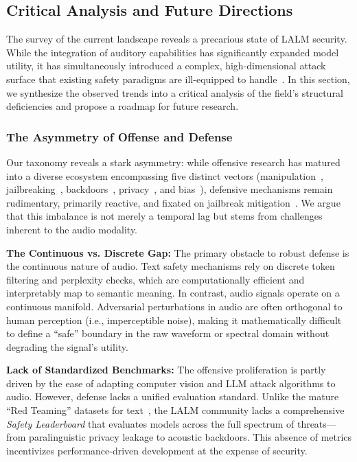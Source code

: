 \subsection{Critical Analysis and Future Directions}

The survey of the current landscape reveals a precarious state of LALM security. While the integration of auditory capabilities has significantly expanded model utility, it has simultaneously introduced a complex, high-dimensional attack surface that existing safety paradigms are ill-equipped to handle~\cite{li2025audiotrust}.
In this section, we synthesize the observed trends into a critical analysis of the field's structural deficiencies and propose a roadmap for future research.

\subsubsection{The Asymmetry of Offense and Defense}

Our taxonomy reveals a stark asymmetry: while offensive research has matured into a diverse ecosystem encompassing five distinct vectors (manipulation~\cite{sadasivan2025attacker}, jailbreaking~\cite{cheng2025jailbreak}, backdoors~\cite{fortier2025backdoor}, privacy~\cite{wang2026hearsay}, and bias~\cite{tam2025medvoicebias}), defensive mechanisms remain rudimentary, primarily reactive, and fixated on jailbreak mitigation~\cite{yang2025reshaping,jin2025almguard}. We argue that this imbalance is not merely a temporal lag but stems from challenges inherent to the audio modality.

\textbf{The Continuous vs. Discrete Gap:} The primary obstacle to robust defense is the continuous nature of audio. Text safety mechanisms rely on discrete token filtering and perplexity checks, which are computationally efficient and interpretably map to semantic meaning. In contrast, audio signals operate on a continuous manifold. Adversarial perturbations in audio are often orthogonal to human perception (i.e., imperceptible noise), making it mathematically difficult to define a ``safe'' boundary in the raw waveform or spectral domain without degrading the signal's utility.

\textbf{Lack of Standardized Benchmarks:} The offensive proliferation is partly driven by the ease of adapting computer vision and LLM attack algorithms to audio. However, defense lacks a unified evaluation standard. Unlike the mature ``Red Teaming'' datasets for text~\cite{zou2023universal}, the LALM community lacks a comprehensive \textit{Safety Leaderboard} that evaluates models across the full spectrum of threats---from paralinguistic privacy leakage to acoustic backdoors. This absence of metrics incentivizes performance-driven development at the expense of security.


